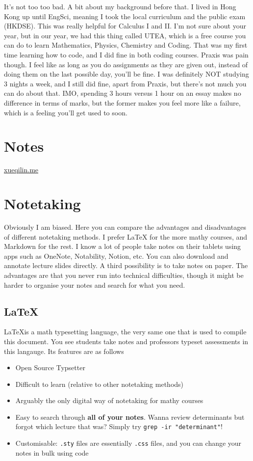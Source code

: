 It's not too too bad. A bit about my background before that. I lived in Hong Kong up until EngSci, meaning I took the local curriculum and the public exam (HKDSE). This was really helpful for Calculus I and II. I'm not sure about your year, but in our year, we had this thing called UTEA, which is a free course you can do to learn Mathematics, Physics, Chemistry and Coding. That was my first time learning how to code, and I did fine in both coding courses. Praxis was pain though. I feel like as long as you do assignments as they are given out, instead of doing them on the last possible day, you'll be fine. I was definitely NOT studying 3 nights a week, and I still did fine, apart from Praxis, but there's not much you can do about that. IMO, spending 3 hours versus 1 hour on an essay makes no difference in terms of marks, but the former makes you feel more like a failure, which is a feeling you'll get used to soon.

\section{Notes}

\url{xueqilin.me}

\section{Notetaking}

Obviously I am biased. Here you can compare the advantages and disadvantages of different notetaking methods. I prefer LaTeX for the more mathy courses, and Markdown for the rest. I know a lot of people take notes on their tablets using apps such as OneNote, Notability, Notion, etc. You can also download and annotate lecture slides directly. A third possibility is to take notes on paper. The advantages are that you never run into technical difficulties, though it might be harder to organise your notes and search for what you need.

\subsection{LaTeX}

\LaTeX is a math typesetting language, the very same one that is used to compile this document. You see students take notes and professors typeset assessments in this langauge. Its features are as follows

\begin{itemize}
    \item Open Source Typsetter
    \item Difficult to learn (relative to other notetaking methods)
    \item Arguably the only digital way of notetaking for mathy courses
    \item Easy to search through \textbf{all of your notes}. Wanna review determinants but forgot which lecture that was? Simply try \verb|grep -ir "determinant"|!
    \item Customisable: \verb|.sty| files are essentially \verb|.css| files, and you can change your notes in bulk using code
\end{itemize}

